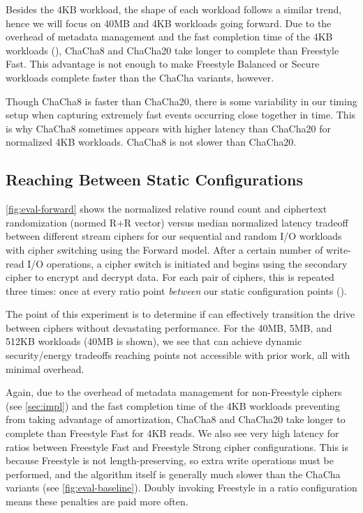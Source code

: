 Besides the 4KB workload, the shape of each workload follows a similar trend,
hence we will focus on 40MB and 4KB workloads going forward. Due to the overhead
of metadata management and the fast completion time of the 4KB workloads
(), ChaCha8 and ChaCha20 take
longer to complete than Freestyle Fast. This advantage is not enough to make
Freestyle Balanced or Secure workloads complete faster than the ChaCha variants,
however.

Though ChaCha8 is faster than ChaCha20, there is some variability in our timing
setup when capturing extremely fast events occurring close together in time.
This is why ChaCha8 sometimes appears with higher latency than ChaCha20 for
normalized 4KB workloads. ChaCha8 is not slower than ChaCha20.


\subsection{Reaching Between Static Configurations}\label{subsec:eval-dynamic}



\cref{fig:eval-forward} shows the normalized relative round count and ciphertext
randomization (normed R+R vector) versus median normalized latency tradeoff
between different stream ciphers for our sequential and random I/O workloads
with cipher switching using the Forward model. After a certain number of
write-read I/O operations, a cipher switch is initiated and \sys begins using
the secondary cipher to encrypt and decrypt data. For each pair of ciphers, this
is repeated three times: once at every ratio point \emph{between} our static
configuration points ().

The point of this experiment is to determine if \sys can effectively transition
the drive between ciphers without devastating performance. For the 40MB, 5MB,
and 512KB workloads (40MB is shown), we see that \sys can achieve dynamic
security/energy tradeoffs reaching points not accessible with prior work, all
with minimal overhead.

Again, due to the overhead of metadata management for non-Freestyle ciphers (see
\cref{sec:impl}) and the fast completion time of the 4KB workloads preventing
\sys from taking advantage of amortization, ChaCha8 and ChaCha20 take longer to
complete than Freestyle Fast for 4KB reads. We also see very high latency for
ratios between Freestyle Fast and Freestyle Strong cipher configurations. This
is because Freestyle is not length-preserving, so extra write operations must be
performed, and the algorithm itself is generally much slower than the ChaCha
variants (see \cref{fig:eval-baseline}). Doubly invoking Freestyle in a ratio
configuration means these penalties are paid more often.

